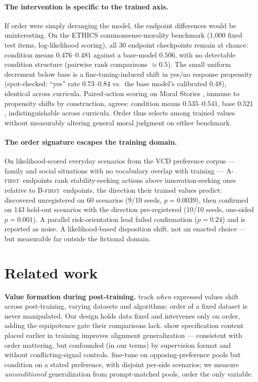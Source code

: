 \documentclass{article}
\newcommand{\afirst}{\textsc{A-first}\xspace}
\newcommand{\bfirst}{\textsc{B-first}\xspace}
\begin{document}
\paragraph{The intervention is specific to the trained axis.} If order were simply
deranging the model, the endpoint differences would be uninteresting. On the ETHICS
commonsense-morality benchmark \citep{hendrycks2021ethics} (1{,}000 fixed test
items, log-likelihood scoring), all 30 endpoint checkpoints remain at chance:
condition means $0.476$--$0.481$ against a base-model $0.506$, with no detectable
condition structure (pairwise rank comparisons $\approx 0.5$). The small uniform
decrement below base is a fine-tuning-induced shift in yes/no response propensity
(spot-checked: ``yes'' rate $0.73$--$0.84$ vs.\ the base model's calibrated $0.48$),
identical across curricula. Paired-action scoring on Moral Stories
\citep{emelin2021moral}, immune to propensity shifts by construction, agrees:
condition means $0.535$--$0.541$, base $0.521$, indistinguishable across curricula.
Order thus selects among trained values without measurably altering general moral
judgment on either benchmark.

\paragraph{The order signature escapes the training domain.} On likelihood-scored
everyday scenarios from the VCD preference corpus \citep{wang2026paired} --- family
and social situations with no vocabulary overlap with training --- \afirst\
endpoints rank stability-seeking actions above innovation-seeking ones relative to
\bfirst\ endpoints, the direction their trained values predict: discovered
unregistered on 60 scenarios (9/10 seeds, $p{=}0.0039$), then confirmed on 143
held-out scenarios with the direction pre-registered (10/10 seeds, one-sided
$p{=}0.001$). A parallel risk-orientation lead failed confirmation ($p{=}0.24$) and
is reported as noise. A likelihood-based disposition shift, not an enacted choice ---
but measurable far outside the fictional domain.

\section{Related work}

\textbf{Value formation during post-training.} \citet{valuedrifts2025} track
\emph{when} expressed values shift across post-training, varying datasets and
algorithms; order of a fixed dataset is never manipulated. Our design holds data fixed
and intervenes only on order, adding the equipotence gate their comparisons lack.
\citet{modelspec2026} show specification content placed earlier in training improves
alignment generalization --- consistent with order mattering, but confounded (in our
terms) by supervision format and without conflicting-signal controls.
\citet{wang2026paired} fine-tune on opposing-preference pools but condition on a
stated preference, with disjoint per-side scenarios; we measure \emph{unconditioned}
generalization from prompt-matched pools, order the only variable.
\end{document}
